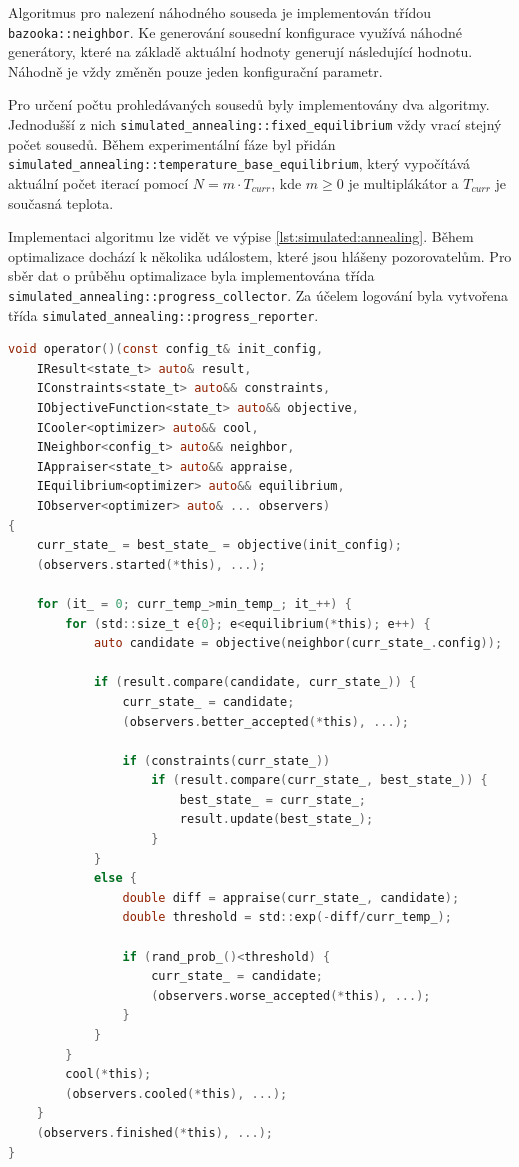 Algoritmus pro nalezení náhodného souseda je implementován třídou \texttt{bazooka::neighbor}.
Ke generování sousední konfigurace využívá náhodné generátory, které na základě aktuální hodnoty generují následující hodnotu.
Náhodně je vždy změněn pouze jeden konfigurační parametr.

Pro určení počtu prohledávaných sousedů byly implementovány dva algoritmy.
Jednodušší z nich \texttt{simulated\_annealing::fixed\_equilibrium} vždy vrací stejný počet sousedů.
Během experimentální fáze byl přidán \texttt{simulated\_annealing::temperature\_base\_equilibrium}, který vypočítává aktuální počet iterací pomocí $N=m \cdot T_{curr}$, kde $m\geq 0$ je multiplákátor a $T_{curr}$ je současná teplota.

Implementaci algoritmu lze vidět ve výpise \ref{lst:simulated:annealing}.
Během optimalizace dochází k několika událostem, které jsou hlášeny pozorovatelům.
Pro sběr dat o průběhu optimalizace byla implementována třída \texttt{simulated\_annealing::progress\_collector}.
Za účelem logování byla vytvořena třída \texttt{simulated\_annealing::progress\_reporter}.

\begin{lstlisting}[caption={~Implementace simulovaného ochlazování},label={lst:simulated:annealing},captionpos=t,abovecaptionskip=-\medskipamount,belowcaptionskip=\medskipamount,language=C]
void operator()(const config_t& init_config,
    IResult<state_t> auto& result,
    IConstraints<state_t> auto&& constraints,
    IObjectiveFunction<state_t> auto&& objective,
    ICooler<optimizer> auto&& cool,
    INeighbor<config_t> auto&& neighbor,
    IAppraiser<state_t> auto&& appraise,
    IEquilibrium<optimizer> auto&& equilibrium,
    IObserver<optimizer> auto& ... observers)
{
    curr_state_ = best_state_ = objective(init_config);
    (observers.started(*this), ...);

    for (it_ = 0; curr_temp_>min_temp_; it_++) {
        for (std::size_t e{0}; e<equilibrium(*this); e++) {
            auto candidate = objective(neighbor(curr_state_.config));

            if (result.compare(candidate, curr_state_)) {
                curr_state_ = candidate;
                (observers.better_accepted(*this), ...);

                if (constraints(curr_state_))
                    if (result.compare(curr_state_, best_state_)) {
                        best_state_ = curr_state_;
                        result.update(best_state_);
                    }
            }
            else {
                double diff = appraise(curr_state_, candidate);
                double threshold = std::exp(-diff/curr_temp_);

                if (rand_prob_()<threshold) {
                    curr_state_ = candidate;
                    (observers.worse_accepted(*this), ...);
                }
            }
        }
        cool(*this);
        (observers.cooled(*this), ...);
    }
    (observers.finished(*this), ...);
}
\end{lstlisting}

